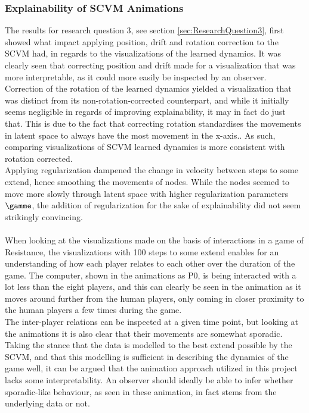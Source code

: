 \subsubsection{Explainability of SCVM Animations}
\label{sec:Discussion:Results:Explainability}
The results for research question 3, see section \ref{sec:ResearchQuestion3}, first showed what impact applying position, drift and rotation correction to the SCVM had, in regards to the visualizations of the learned dynamics.
It was clearly seen that correcting position and drift made for a visualization that was more interpretable, as it could more easily be inspected by an observer.
Correction of the rotation of the learned dynamics yielded a visualization that was distinct from its non-rotation-corrected counterpart, and while it initially seems negligible in regards of improving explainability, it may in fact do just that.
This is due to the fact that correcting rotation standardises the movements in latent space to always have the most movement in the x-axis..
As such, comparing visualizations of SCVM learned dynamics is more consistent with rotation corrected.
\\
Applying regularization dampened the change in velocity between steps to some extend, hence smoothing the movements of nodes. 
While the nodes seemed to move more slowly through latent space with higher regularization parameters $\gamme$, the addition of regularization for the sake of explainability did not seem strikingly convincing.
\\\\
When looking at the visualizations made on the basis of interactions in a game of Resistance, the visualizations with 100 steps to some extend enables for an understanding of how each player relates to each other over the duration of the game. 
The computer, shown in the animations as P0, is being interacted with a lot less than the eight players, and this can clearly be seen in the animation as it moves around further from the human players, only coming in closer proximity to the human players a few times during the game.
\\
The inter-player relations can be inspected at a given time point, but looking at the animations it is also clear that their movements are somewhat sporadic.
Taking the stance that the data is modelled to the best extend possible by the SCVM, and that this modelling is sufficient in describing the dynamics of the game well, it can be argued that the animation approach utilized in this project lacks some interpretability.
An observer should ideally be able to infer whether sporadic-like behaviour, as seen in these animation, in fact stems from the underlying data or not.
